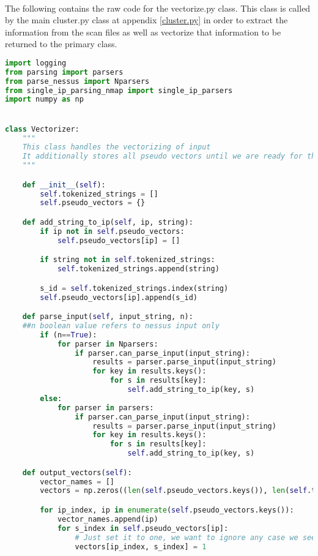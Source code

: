 \paragraph{}The following contains the raw code for the vectorize.py class. This class is called by the main cluster.py class at appendix \ref{cluster.py} in order to extract the information from the scan files as well as vectorize that information to be returned to the primary class.
\begin{lstlisting}[language=python]
import logging
from parsing import parsers
from parse_nessus import Nparsers
from single_ip_parsing_nmap import single_ip_parsers
import numpy as np


class Vectorizer:
    """
    This class handles the vectorizing of input
    It additionally stores all pseudo vectors until we are ready for the finished vectors
    """

    def __init__(self):
        self.tokenized_strings = []
        self.pseudo_vectors = {}

    def add_string_to_ip(self, ip, string):
        if ip not in self.pseudo_vectors:
            self.pseudo_vectors[ip] = []

        if string not in self.tokenized_strings:
            self.tokenized_strings.append(string)

        s_id = self.tokenized_strings.index(string)
        self.pseudo_vectors[ip].append(s_id)

    def parse_input(self, input_string, n):
    ##n boolean value refers to nessus input only
        if (n==True):
            for parser in Nparsers:
                if parser.can_parse_input(input_string):
                    results = parser.parse_input(input_string)
                    for key in results.keys():
                        for s in results[key]:
                            self.add_string_to_ip(key, s)
        else:
            for parser in parsers:
                if parser.can_parse_input(input_string):
                    results = parser.parse_input(input_string)
                    for key in results.keys():
                        for s in results[key]:
                            self.add_string_to_ip(key, s)

    def output_vectors(self):
        vector_names = []
        vectors = np.zeros((len(self.pseudo_vectors.keys()), len(self.tokenized_strings)), dtype=np.float)

        for ip_index, ip in enumerate(self.pseudo_vectors.keys()):
            vector_names.append(ip)
            for s_index in self.pseudo_vectors[ip]:
                # Just set it to one, we want to ignore any case we see a value more than once
                vectors[ip_index, s_index] = 1


\end{lstlisting}
